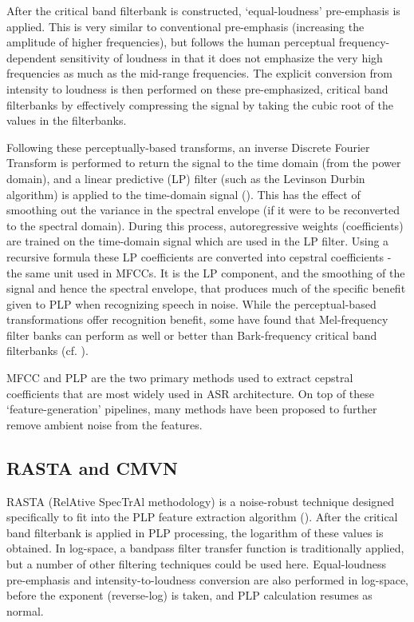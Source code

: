 After the critical band filterbank is constructed, `equal-loudness' pre-emphasis is applied.  This is very similar to conventional pre-emphasis (increasing the amplitude of higher frequencies), but follows the human perceptual frequency-dependent sensitivity of loudness in that it does not emphasize the very high frequencies as much as the mid-range frequencies.%
The explicit conversion from intensity to loudness is then performed on these pre-emphasized, critical band filterbanks by effectively compressing the signal by taking the cubic root of the values in the filterbanks.

Following these perceptually-based transforms, an inverse Discrete Fourier Transform is performed to return the signal to the time domain (from the power domain), and a linear predictive (LP) filter (such as the Levinson Durbin algorithm) is applied to the time-domain signal (\cite{gold:11}).  This has the effect of smoothing out the variance in the spectral envelope (if it were to be reconverted to the spectral domain).  During this process, autoregressive weights (coefficients) are trained on the time-domain signal which are used in the LP filter.  Using a recursive formula these LP coefficients are converted into cepstral coefficients - the same unit used in MFCCs.  It is the LP component, and the smoothing of the signal and hence the spectral envelope, that produces much of the specific benefit given to PLP when recognizing speech in noise.  While the perceptual-based transformations offer recognition benefit, some have found that Mel-frequency filter banks can perform as well or better than Bark-frequency critical band filterbanks (cf. \cite{honig:05}).

MFCC and PLP are the two primary methods used to extract cepstral coefficients that are most widely used in ASR architecture.  On top of these `feature-generation' pipelines, many methods have been proposed to further remove ambient noise from the features.

\subsection{RASTA and CMVN}\label{sec:rasta_cmvn}

RASTA (RelAtive SpecTrAl methodology) is a noise-robust technique designed specifically to fit into the PLP feature extraction algorithm (\cite{hermansky:92}).  After the critical band filterbank is applied in PLP processing, the logarithm of these values is obtained.  In log-space, a bandpass filter transfer function is traditionally applied, but a number of other filtering techniques could be used here.  Equal-loudness pre-emphasis and intensity-to-loudness conversion are also performed in log-space, before the exponent (reverse-log) is taken, and PLP calculation resumes as normal.


